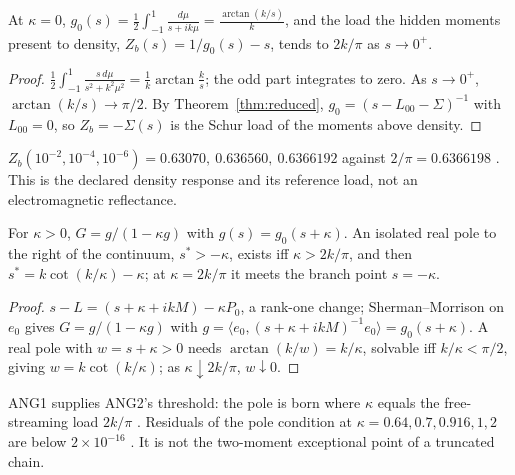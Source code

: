 \begin{proposition}\label{prop:ang1}
At $\kappa=0$, $g_0(s)=\tfrac12\int_{-1}^1\frac{d\mu}{s+ik\mu}=\frac{\arctan(k/s)}{k}$, and the load the hidden moments present to density, $Z_b(s)=1/g_0(s)-s$, tends to $2k/\pi$ as $s\to0^+$. 
\end{proposition}
\begin{proof}
$\tfrac12\int_{-1}^1\frac{s\,d\mu}{s^2+k^2\mu^2}=\frac1k\arctan\frac ks$; the odd part integrates to zero. As $s\to0^+$, $\arctan(k/s)\to\pi/2$. By Theorem~\ref{thm:reduced}, $g_0=(s-L_{00}-\Sigma)^{-1}$ with $L_{00}=0$, so $Z_b=-\Sigma(s)$ is the Schur load of the moments above density.
\end{proof}
$Z_b(10^{-2},10^{-4},10^{-6})=0.63070,\ 0.636560,\ 0.6366192$ against $2/\pi=0.6366198$ . This is the declared density response and its reference load, not an electromagnetic reflectance.

\begin{proposition}\label{prop:ang2}
For $\kappa>0$, $G=g/(1-\kappa g)$ with $g(s)=g_0(s+\kappa)$. An isolated real pole to the right of the continuum, $s^*>-\kappa$, exists iff $\kappa>2k/\pi$, and then $s^*=k\cot(k/\kappa)-\kappa$; at $\kappa=2k/\pi$ it meets the branch point $s=-\kappa$. 
\end{proposition}
\begin{proof}
$s-L=(s+\kappa+ikM)-\kappa P_0$, a rank-one change; Sherman–Morrison on $e_0$ gives $G=g/(1-\kappa g)$ with $g=\langle e_0,(s+\kappa+ikM)^{-1}e_0\rangle=g_0(s+\kappa)$. A real pole with $w=s+\kappa>0$ needs $\arctan(k/w)=k/\kappa$, solvable iff $k/\kappa<\pi/2$, giving $w=k\cot(k/\kappa)$; as $\kappa\downarrow2k/\pi$, $w\downarrow0$.
\end{proof}
ANG1 supplies ANG2's threshold: the pole is born where $\kappa$ equals the free-streaming load $2k/\pi$ . Residuals of the pole condition at $\kappa=0.64,0.7,0.916,1,2$ are below $2\times10^{-16}$ . It is not the two-moment exceptional point of a truncated chain.

